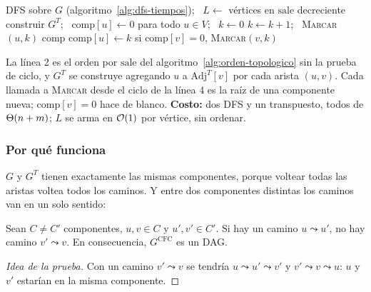 \documentclass[11pt,letterpaper]{article}
\begin{document}
\begin{algorithm}[H]
\caption{\textsc{Componentes-Fuertes}$(G)$, dos DFS (Kosaraju)}
\label{alg:componentes-fuertes}
\begin{algorithmic}[1]
  \State DFS sobre $G$ (algoritmo~\ref{alg:dfs-tiempos}); \ $L \gets$
         vértices en $\text{sale}$ decreciente
  \State construir $G^T$; \ $\text{comp}[u] \gets 0$ para todo
         $u \in V$; \ $k \gets 0$ 
   
      \State $k \gets k + 1$; \ \textsc{Marcar}$(u, k)$
    \EndIf
  \EndFor
  \State \Return $\text{comp}$
\EndProcedure
\Statex
{} 
  \State $\text{comp}[u] \gets k$
    \State si $\text{comp}[v] = 0$, \textsc{Marcar}$(v, k)$
  \EndFor
\EndProcedure
\end{algorithmic}
\end{algorithm}

La línea 2 es el orden por $\text{sale}$ del
algoritmo~\ref{alg:orden-topologico} sin la prueba de ciclo, y $G^T$
se construye agregando $u$ a $\text{Adj}^T[v]$ por cada arista
$(u, v)$. Cada llamada a \textsc{Marcar} desde el ciclo de la línea 4
es la raíz de una componente nueva; $\text{comp}[v] = 0$ hace de
blanco. \textbf{Costo:} dos DFS y un transpuesto, todos de
$\Theta\!\left(n + m\right)$; $L$ se arma en $\mathcal{O}\!\left(1\right)$ por vértice, sin ordenar.

\subsubsection*{Por qué funciona}

$G$ y $G^T$ tienen exactamente las mismas componentes, porque voltear
todas las aristas voltea todos los caminos. Y entre dos componentes
distintas los caminos van en un solo sentido:

\begin{lema}
  \label{lem:componentes-dag}
  Sean $C \neq C'$ componentes, $u, v \in C$ y $u', v' \in C'$. Si hay
  un camino $u \leadsto u'$, no hay camino $v' \leadsto v$. En
  consecuencia, $G^{\text{CFC}}$ es un DAG.
\end{lema}

\begin{proof}[Idea de la prueba]
  Con un camino $v' \leadsto v$ se tendría $u \leadsto u' \leadsto v'$
  y $v' \leadsto v \leadsto u$: $u$ y $v'$ estarían en la misma
  componente.
\end{proof}
\end{document}
